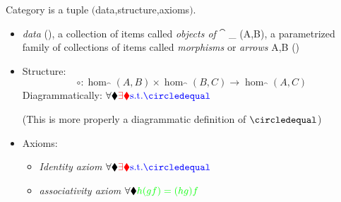 \documentclass[preview]{standalone}
\begin{document}
 

\begin{definition}[Category ]
Category is a tuple $($data,structure,axioms$)$.
\begin{itemize}
\item \emph{data} 
		\catdef{\cat}
			{\Obj(\cat), \textrm{a collection of items called \emph{objects of $\cat$}}}
			{\hom_{\cat} (A,B), \textrm{a parametrized family of collections of items called \emph{morphisms} or \emph{arrows}} \forall A,B \in  \Obj(\cat)}	

\item Structure:
	\begin{displaymath}
		\circ : \hom_{\cat}(A,B) \times \hom_{\cat}(B,C) \rightarrow \hom_{\cat} (A,C)
	\end{displaymath}
	Diagrammatically: 
	$\forall \bulk \textcolor{red}{\exists \bulk} \textcolor{blue}{\St \commute}$\\
		(This is more properly a diagrammatic definition of  $\commute$)

\item Axioms:
	\begin{itemize}
		\item \emph{Identity axiom}
			$\forall \bulk \textcolor{red}{\exists \bulk} \textcolor{blue}{\St \commute}$\\
		\item \emph{associativity axiom}
			$\forall \blacklozenge \textcolor{green}{h (gf) = (hg) f}$			\\
	\end{itemize}
	
\end{itemize}
\end{definition}
\end{document}
